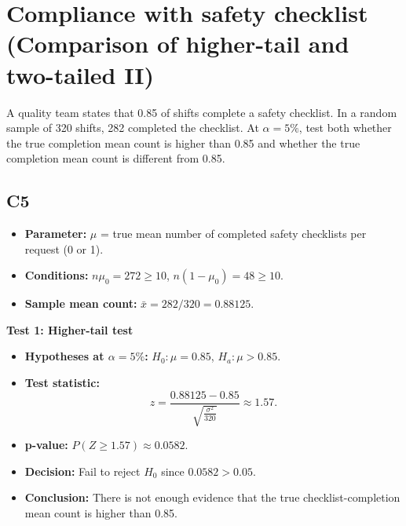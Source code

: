 \begin{center}
\end{center}


\section{Compliance with safety checklist (Comparison of higher-tail and two-tailed II)}
A quality team states that 0.85 of shifts complete a safety checklist. In a random sample of 320 shifts, 282 completed the checklist. At \(\alpha=5\%\), test both whether the true completion mean count is higher than 0.85 and whether the true completion mean count is different from 0.85.

\subsection*{C5}
\begin{itemize}
	\item \textbf{Parameter:} \(\mu\) = true mean number of completed safety checklists per request (0 or 1).
	\item \textbf{Conditions:} \(n\mu_0=272\ge10\), \(n(1-\mu_0)=48\ge10\).
	\item \textbf{Sample mean count:} \(\bar x=282/320=0.88125\).
\end{itemize}

\textbf{Test 1: Higher-tail test}

\begin{itemize}
	\item \textbf{Hypotheses at \(\alpha=5\%\):} \(H_0\colon \mu=0.85\), \(H_a\colon \mu>0.85\).
	\item \textbf{Test statistic:}
	\[
	z=\frac{0.88125-0.85}{\sqrt{\frac{\sigma^2}{320}}}\approx 1.57.
	\]
	\item \textbf{p-value:} \(P(Z\ge 1.57)\approx 0.0582\).
	\item \textbf{Decision:} Fail to reject \(H_0\) since \(0.0582>0.05\).
	\item \textbf{Conclusion:} There is not enough evidence that the true checklist-completion mean count is higher than 0.85.
\end{itemize}

\begin{center}
\end{center}

